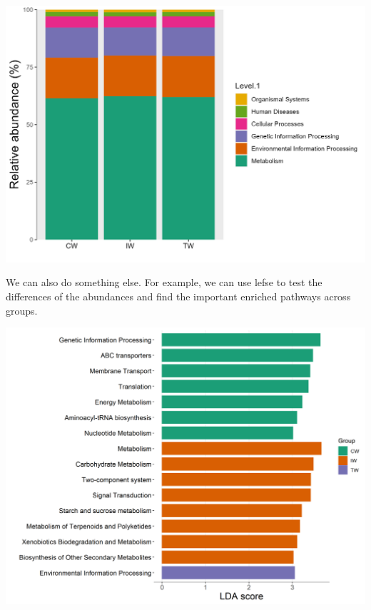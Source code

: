 \documentclass[
]{book}
\newenvironment{Shaded}{\begin{snugshade}}{\end{snugshade}}
\newcommand{\AttributeTok}[1]{\textcolor[rgb]{0.77,0.63,0.00}{#1}}
\newcommand{\ConstantTok}[1]{\textcolor[rgb]{0.00,0.00,0.00}{#1}}
\newcommand{\DecValTok}[1]{\textcolor[rgb]{0.00,0.00,0.81}{#1}}
\newcommand{\FloatTok}[1]{\textcolor[rgb]{0.00,0.00,0.81}{#1}}
\newcommand{\FunctionTok}[1]{\textcolor[rgb]{0.00,0.00,0.00}{#1}}
\newcommand{\NormalTok}[1]{#1}
\newcommand{\OtherTok}[1]{\textcolor[rgb]{0.56,0.35,0.01}{#1}}
\newcommand{\SpecialCharTok}[1]{\textcolor[rgb]{0.00,0.00,0.00}{#1}}
\newcommand{\StringTok}[1]{\textcolor[rgb]{0.31,0.60,0.02}{#1}}
\begin{document}
\begin{center}\includegraphics[width=600px]{Images/plot_bar_tax4fun1} \end{center}

We can also do something else. For example, we can use lefse to test the differences of the abundances and find the important enriched pathways across groups.

\begin{Shaded}
\end{Shaded}

\begin{center}\includegraphics[width=600px]{Images/plot_lefse_bar_tax4fun} \end{center}
\end{document}
